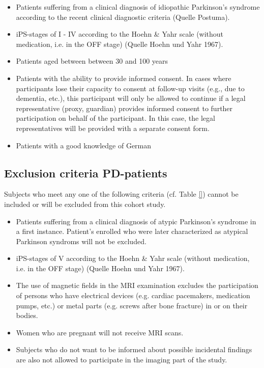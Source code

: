 \documentclass[
	a4paper, 
	11.5pt,
	headings=small, 
	twoside, 
	titlepage=firstiscover, 
 	pagesize=auto,
  	version=last,
	open=any,
	BCOR=14mm,
  	chapterprefix=false]{scrbook}
\begin{document}
\begin{itemize}
\item Patients suffering from a clinical diagnosis of idiopathic Parkinson's syndrome according to the recent clinical diagnostic criteria (Quelle Postuma).
\item \ac{iPS}-stages of I - IV according to the Hoehn \& Yahr scale (without medication, i.e. in the OFF stage) (Quelle Hoehn und Yahr 1967).
\item Patients aged between between 30 and 100 years
\item Patients with the ability to provide informed consent. In cases where participants lose their capacity to consent at follow-up visits (e.g., due to dementia, etc.), this participant will only be allowed to continue if a legal representative (proxy, guardian) provides informed consent to further participation on behalf of the participant. In this case, the legal representatives will be provided with a separate consent form.   
\item Patients with a good knowledge of German
\end{itemize}

\subsection{Exclusion criteria \ac{PD}-patients}
\label{sec:exclusion_criteriaIPS}
Subjects who meet any one of the following criteria (cf. Table \ref{}) cannot be included or will be excluded from this cohort study.
\begin{itemize}
\item Patients suffering from a clinical diagnosis of atypic Parkinson's syndrome in a first instance. Patient's enrolled who were later characterized as atypical Parkinson syndroms will not be excluded.
\item \ac{iPS}-stages of V according to the Hoehn \& Yahr scale (without medication, i.e. in the OFF stage) (Quelle Hoehn und Yahr 1967).
\item The use of magnetic fields in the MRI examination excludes the participation of persons who have electrical devices (e.g. cardiac pacemakers, medication pumps, etc.) or metal parts (e.g. screws after bone fracture) in or on their bodies. 
\item Women who are pregnant will not receive \ac{MRI} scans.
\item Subjects who do not want to be informed about possible incidental findings are also not allowed to participate in the imaging part of the study.
\end{itemize}
\end{document}
